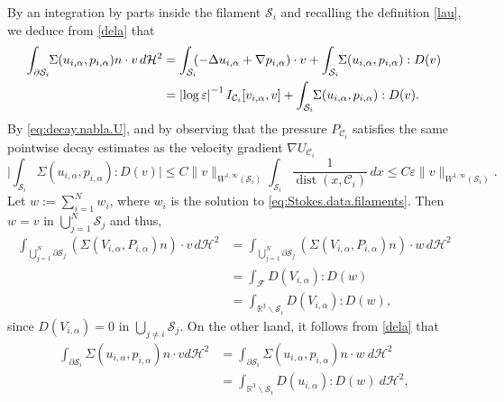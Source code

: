 \documentclass[10pt]{amsart}
\newcommand{\R}{\mathbb{R}}
\let\eps\varepsilon
\newcommand{\dd}{\,d}
\DeclareMathOperator{\dist}{dist}
\theoremstyle{definition}
\theoremstyle{remark}
\let\oldbigcup\bigcup
\begin{document}
By an integration by parts inside the filament $\mathcal S_{i}$ and recalling the definition \eqref{lau}, we deduce from \eqref{dela} that
\begin{equation}
\begin{aligned}
\int_{\partial \mathcal S_{i}}\hspace*{-1mm} \Sigma(u_{i,\alpha},p_{i,\alpha}) n \cdot v \, d\mathcal{H}^2
&= \int_{\mathcal S_{i}}\hspace*{-1mm} (-\Delta u_{i,\alpha} + \nabla p_{i,\alpha}) \cdot v + \int_{\mathcal S_{i}}\hspace*{-1mm} \Sigma(u_{i,\alpha},p_{i,\alpha}) : D(v) \\
\label{24}
& = \left|\log \eps\right|^{-1} I_{\mathcal{C}_i } [v_{i,\alpha},v]
+ \int_{\mathcal S_{i}}\hspace*{-1mm} \Sigma(u_{i,\alpha},p_{i,\alpha}) : D(v).
\end{aligned}
\end{equation}
By \eqref{eq:decay.nabla.U}, and by observing that the pressure $P_{\mathcal C_i}$ satisfies the same pointwise decay estimates as the velocity gradient $\nabla U_{\mathcal C_i}$
\begin{equation}
\label{doute}
\biggl|\int_{\mathcal S_{i}} \Sigma(u_{i,\alpha},p_{i,\alpha}) : D(v)\biggr| \leq C \|v\|_{W^{1,\infty}{(\mathcal S_{i})}} \int_{\mathcal S_{i}} \frac 1 {\dist(x,\mathcal C_i)} \dd x \leq C \eps \|v\|_{W^{1,\infty}{(\mathcal S_{i})}}.
\end{equation}
Let $w := \sum_{i=1}^N w_i$, where $w_i$ is the solution to \eqref{eq:Stokes.data.filaments}.
Then $w = v$ in $\bigcup_{j=1}^N \mathcal S_j$ and thus,
\begin{align*}
\int_{\oldbigcup_{j=1}^N \partial \mathcal S_j} (\Sigma (V_{i,\alpha}, P_{i,\alpha}) n) \cdot v \, d\mathcal{H}^2
&= \int_{\oldbigcup_{j=1}^N \partial \mathcal S_j} (\Sigma (V_{i,\alpha}, P_{i,\alpha}) n) \cdot w \, d\mathcal{H}^2
\\ & =
\int_{\mathcal F} D(V_{i,\alpha}) : D(w)
\\ & =
\int_{\R^3 \smallsetminus \mathcal S_i } D(V_{i,\alpha}) : D(w),
\end{align*}
since
$D (V_{i, \alpha}) = 0 $ in $\bigcup_{{j\neq i}} \mathcal S_j$. On the other hand, it follows from \eqref{dela} that
\begin{align*}
\int_{\partial \mathcal S_i} \Sigma (u_{i,\alpha}, p_{i,\alpha}) n \cdot v {d\mathcal{H}^2} &= \int_{\partial \mathcal S_i} \Sigma (u_{i,\alpha}, p_{i,\alpha}) n \cdot w {\
d\mathcal{H}^2}
\\ &=
\int_{\R^3 \smallsetminus \mathcal S_i } D(u_{i,\alpha}) : D(w) {\
d\mathcal{H}^2},
\end{align*}
\end{document}
